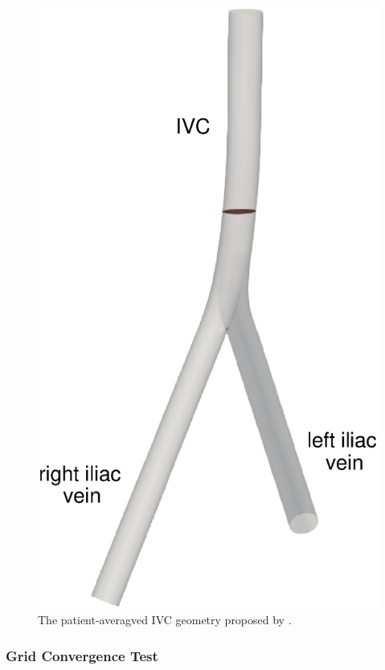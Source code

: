 \begin{figure}[htbp]
    \centering
    \includegraphics[scale=0.3]{imgs/vena_cava/venacava_plot.eps}
    \caption{The patient-averagved IVC geometry proposed by \cite{gallagher_exp} .}
    \label{fig:IVCgeo}
\end{figure}

\subsubsection*{Grid Convergence Test}

